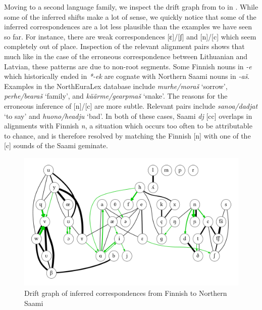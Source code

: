 Moving to a second language family, we inspect the drift graph from  to  in . While some of the inferred shifts make a lot of sense, we quickly notice that some of the inferred correspondences are a lot less plausible than the examples we have seen so far. For instance, there are weak correspondences [ɛ]/[ʃ] and [n]/[c] which seem completely out of place. Inspection of the relevant alignment pairs shows that much like in the case of the erroneous correspondence between Lithuanian and Latvian, these patterns are due to non-root segments. Some Finnish nouns in \textit{-e} which historically ended in \textit{*-ek} are cognate with Northern Saami nouns in \textit{-a\v{s}}. Examples in the NorthEuraLex database include \textit{murhe/mora\v{s}} `sorrow', \textit{perhe/beara\v{s}} `family', and \textit{k\"a\"arme/gearpma\v{s}} `snake'. The reasons for the erroneous inference of [n]/[c] are more subtle. Relevant pairs include \textit{sanoa/dadjat} `to say' and \textit{huono/headju} `bad'. In both of these cases, Saami \textit{dj} [cc] overlaps in alignments with Finnish \textit{n}, a situation which occurs too often to be attributable to chance, and is therefore resolved by matching the Finnish [n] with one of the [c] sounds of the Saami geminate.

\begin{figure}
\includegraphics[width=\textwidth]{figures/drift-graph-fi-se.pdf}
\caption{Drift graph of inferred correspondences from Finnish to Northern Saami}
\label{fig:driftGraphFiSe}
\end{figure}

